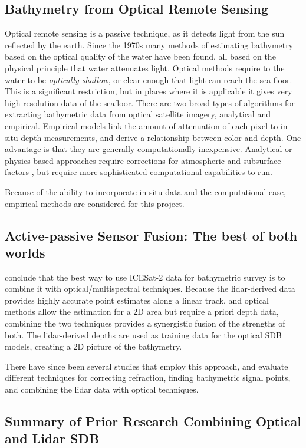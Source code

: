 \subsection{Bathymetry from Optical Remote Sensing}
Optical remote sensing is a passive technique, as it detects light from the sun reflected by the earth. Since the 1970s many methods of estimating bathymetry based on the optical quality of the water have been found, all based on the physical principle that water attenuates light. Optical methods require to the water to be \emph{optically shallow}, or clear enough that light can reach the sea floor. This is a significant restriction, but in places where it is applicable it gives very high resolution data of the seafloor. There are two broad types of algorithms for extracting bathymetric data from optical satellite imagery, analytical and empirical. Empirical models link the amount of attenuation of each pixel to in-situ depth measurements, and derive a relationship between color and depth. One advantage is that they are generally computationally inexpensive. Analytical or physics-based approaches require corrections for atmospheric and subsurface factors \parencite{Turner2021}, but require more sophisticated computational capabilities to run.

Because of the ability to incorporate in-situ data and the computational ease, empirical methods are considered for this project.

\subsection{Active-passive Sensor Fusion: The best of both worlds}
\citeauthor{Parrish2019} conclude that the best way to use ICESat-2 data for bathymetric survey is to combine it with optical/multispectral techniques. Because the lidar-derived data provides highly accurate point estimates along a linear track, and optical methods allow the estimation for a 2D area but require a priori depth data, combining the two techniques provides a synergistic fusion of the strengths of both. The lidar-derived depths are used as training data for the optical SDB models, creating a 2D picture of the bathymetry.

There have since been several studies that employ this approach, and evaluate different techniques for correcting refraction, finding bathymetric signal points, and combining the lidar data with optical techniques.

\subsection{Summary of Prior Research Combining Optical and Lidar SDB}

